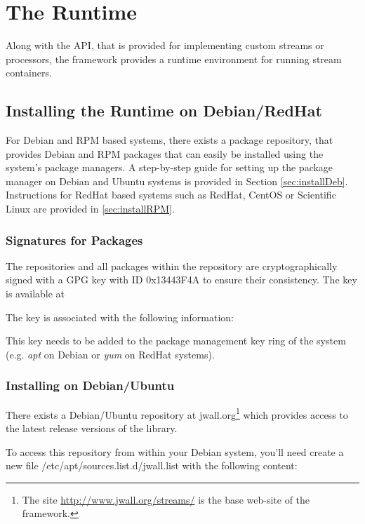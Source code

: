 \section{The \streams Runtime}
Along with the \streams API, that is provided for implementing custom
streams or processors, the \streams framework provides a runtime
environment for running stream containers.

\subsection{Installing the \streams Runtime on Debian/RedHat}
For Debian and RPM based systems, there exists a package repository,
that provides Debian and RPM packages that can easily be installed
using the system's package managers. A step-by-step guide for setting
up the package manager on Debian and Ubuntu systems is provided in
Section \ref{sec:installDeb}. Instructions for RedHat based systems
such as RedHat, CentOS or Scientific Linux are provided in
\ref{sec:installRPM}.


\subsubsection{\label{sec:gpgKey}Signatures for Packages}
The repositories and all packages within the repository are
cryptographically signed with a GPG key with ID {\ttfamily 0x13443F4A}
to ensure their consistency. The key is available at


The key is associated with the following information:

This key needs to be added to the package management key ring of the
system (e.g. {\em apt} on Debian or {\em yum} on RedHat systems).

\subsubsection{\label{sec:installDeb}Installing on Debian/Ubuntu}
There exists a Debian/Ubuntu repository at {\ttfamily
  jwall.org}\footnote{The site \url{http://www.jwall.org/streams/} is
  the base web-site of the \streams framework.} which provides access
to the latest release versions of the \streams library.

To access this repository from within your Debian system, you'll need
create a new file {\ttfamily /etc/apt/sources.list.d/jwall.list} with
the following content:

